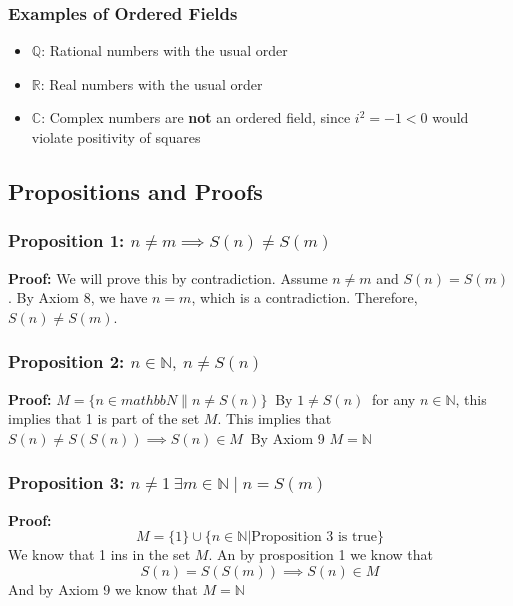 \subsubsection{Examples of Ordered Fields}

\begin{itemize}[label=\(-\)]
    \item \( \mathbb{Q} \): Rational numbers with the usual order
    \item \( \mathbb{R} \): Real numbers with the usual order
    \item \( \mathbb{C} \): Complex numbers are \textbf{not} an ordered field, since \( i^2 = -1 < 0 \) would violate positivity of squares
\end{itemize}


\subsection{Propositions and Proofs}

\subsubsection{Proposition 1: \texorpdfstring{\(n \ne m \implies S(n) \ne S(m)\)}{n!= m implies S (n)!=S (m)}}

\textbf{Proof:} We will prove this by contradiction. Assume \( n \ne m \) and \( S(n) = S(m) \). By Axiom 8, we have \( n = m \), which is a contradiction. Therefore, \( S(n) \ne S(m) \).

\subsubsection{Proposition 2: \texorpdfstring{ \(n \in \mathbb{N},\ n \ne S(n)\)}{For any n in N, n!= S (n)}}

\textbf{Proof:} \(M = \{n \in mathbb{N} \| n \ne S(n) \}\ \)
By \(1 \ne S(n)\ \) for any \(n \in \mathbb{N}\), this implies that 1 is part of the set \(M\). This implies that \(S(n) \ne S(S(n)) \implies S(n) \in M\ \) By Axiom 9 \(M = \mathbb{N}\)

\subsubsection{Proposition 3: \texorpdfstring{\(n \ne 1\ \exists m \in \mathbb{N} \mid n = S(m)\)}{n!= 1, exists m in N | n = S (m)}}

\textbf{Proof:}
\[
	M = \{1\} \cup\{n \in \mathbb{N} | \text{Proposition 3 is true}\}
\]
We know that 1 ins in the set \(M\). An by prosposition 1 we know that
\[
	S(n) = S(S(m)) \implies S(n) \in M
\]
And by Axiom 9 we know that \(M = \mathbb{N}\)

